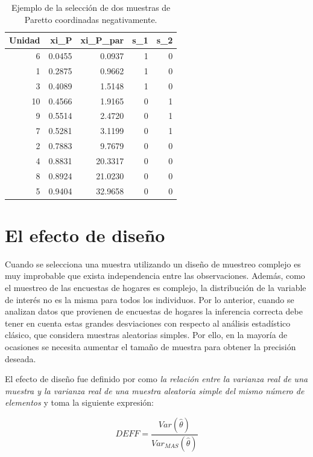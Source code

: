 \documentclass[
  12pt,
]{book}
\begin{document}
\begin{table}

\caption{\label{tab:tabcoor4}Ejemplo de la selección de dos muestras de Paretto coordinadas negativamente.}
\centering
\begin{tabular}[t]{r|r|r|r|r}
\hline
Unidad & xi\_P & xi\_P\_par & s\_1 & s\_2\\
\hline
6 & 0.0455 & 0.0937 & 1 & 0\\
\hline
1 & 0.2875 & 0.9662 & 1 & 0\\
\hline
3 & 0.4089 & 1.5148 & 1 & 0\\
\hline
10 & 0.4566 & 1.9165 & 0 & 1\\
\hline
9 & 0.5514 & 2.4720 & 0 & 1\\
\hline
7 & 0.5281 & 3.1199 & 0 & 1\\
\hline
2 & 0.7883 & 9.7679 & 0 & 0\\
\hline
4 & 0.8831 & 20.3317 & 0 & 0\\
\hline
8 & 0.8924 & 21.0230 & 0 & 0\\
\hline
5 & 0.9404 & 32.9658 & 0 & 0\\
\hline
\end{tabular}
\end{table}

\hypertarget{el-efecto-de-diseuxf1o}{%
\chapter{El efecto de diseño}\label{el-efecto-de-diseuxf1o}}

Cuando se selecciona una muestra utilizando un diseño de muestreo complejo es muy improbable que exista independencia entre las observaciones. Además, como el muestreo de las encuestas de hogares es complejo, la distribución de la variable de interés no es la misma para todos los individuos. Por lo anterior, cuando se analizan datos que provienen de encuestas de hogares la inferencia correcta debe tener en cuenta estas grandes desviaciones con respecto al análisis estadístico clásico, que considera muestras aleatorias simples. Por ello, en la mayoría de ocasiones se necesita aumentar el tamaño de muestra para obtener la precisión deseada.

El efecto de diseño fue definido por \citet[página 258]{Kish_1965} como \emph{la relación entre la varianza real de una muestra y la varianza real de una muestra aleatoria simple del mismo número de elementos} y toma la siguiente expresión:

\[
DEFF=\frac{Var(\hat{\theta})}{Var_{MAS}(\hat{\theta})}
\]
\end{document}
